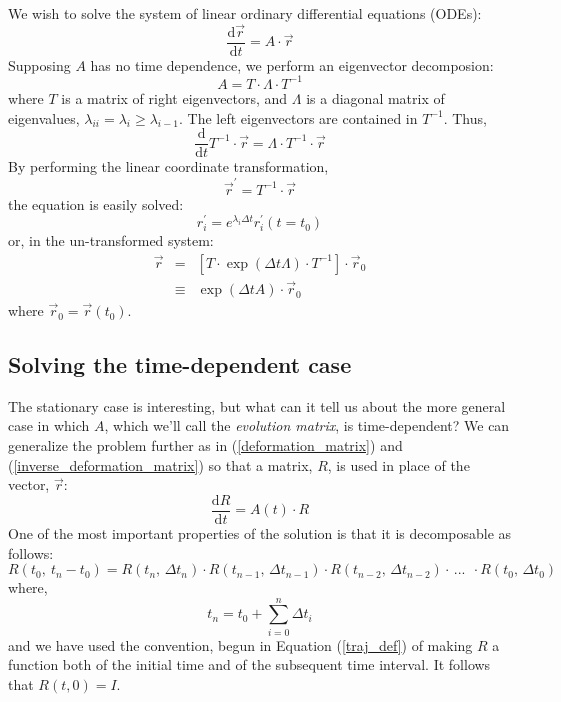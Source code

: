 \documentclass[11pt]{article}
\begin{document}
We wish to solve the system of linear ordinary differential equations (ODEs):
\begin{equation}
\frac{\mathrm d \vec r}{\mathrm d t}=A \cdot \vec r
\label{linear_ODE_system_vector_soln}
\end{equation}
Supposing $A$ has no time dependence, we perform an eigenvector 
decomposion:
\begin{equation}
  A = T \cdot \Lambda \cdot T^{-1}
  \label{eigenvalue_expansion}
\end{equation}
where $T$ is a matrix of right eigenvectors, and $\Lambda$ is a diagonal matrix
of eigenvalues, $\lambda_{ii}=\lambda_i \ge \lambda_{i-1}$.  
The left eigenvectors are contained in $T^{-1}$.
Thus,
\begin{equation}
  \frac{\mathrm d}{\mathrm d t} T^{-1} \cdot \vec r=\Lambda \cdot T^{-1} \cdot  \vec r
\end{equation}
By performing the linear coordinate transformation,
\begin{equation}
  \vec r^\prime=T^{-1} \cdot \vec r
\end{equation}
the equation is easily solved:
\begin{equation}
r^\prime_i = e^{\lambda_i \Delta t} r^\prime_i(t=t_0)
\end{equation}
or, in the un-transformed system:
\begin{eqnarray}
  \vec r & = & \left [T \cdot \exp(\Delta t \Lambda) \cdot T^{-1} \right ] \cdot \vec r_0 
\label{solution_no_time_dependence} \\
& \equiv & \exp(\Delta t A)\cdot \vec r_0
\end{eqnarray}
where $\vec r_0=\vec r(t_0)$.

\subsection{Solving the time-dependent case}

The stationary case is interesting, but what can it tell us about the 
more general case in which $A$, which we'll call the {\it evolution matrix},
is time-dependent?
We can generalize the problem further as in (\ref{deformation_matrix}) and
(\ref{inverse_deformation_matrix}) so that a matrix, $R$, 
is used in place of the vector, $\vec r$:
\begin{equation}
\frac{\mathrm d R}{\mathrm d t}=A(t) \cdot R
\label{linear_ODE_system_matrix_soln}
\end{equation}
One of the most important properties of the solution is that it
is decomposable as follows:
\begin{equation}
	R(t_0,~t_n-t_0) = R(t_n,\,\Delta t_n) \cdot R(t_{n-1},\,\Delta t_{n-1}) \cdot R(t_{n-2},\,\Delta t_{n-2}) \cdot \, ...~~ 
	\cdot R(t_0,\,\Delta t_0)
\label{matrix_soln_decomposition}
\end{equation}
where,
\begin{equation}
t_n=t_0+\sum_{i=0}^n \Delta t_i
\end{equation}
and we have used the convention, begun
in Equation (\ref{traj_def}) of making $R$ a function both of the
initial time and of the subsequent time interval.  
It follows that $R(t, 0)=I$.
\end{document}
